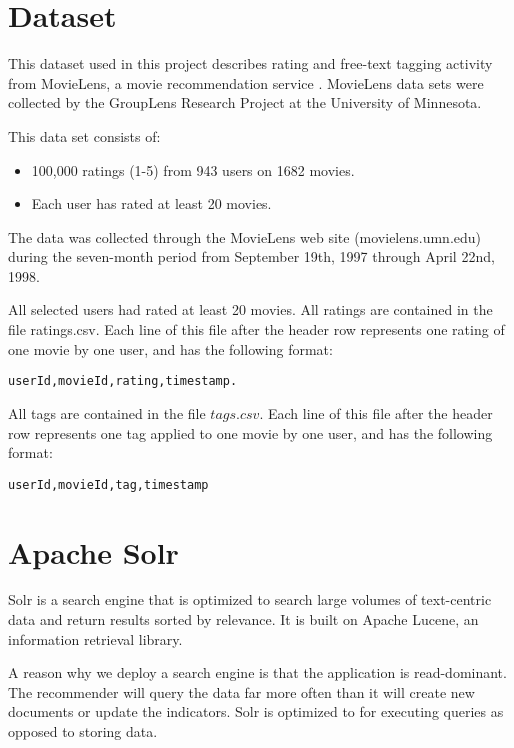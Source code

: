 \documentclass[twoside,a4paper]{article}
\begin{document}
\section{Dataset}
\label{sec:dataset}

This dataset used in this project describes rating and free-text tagging activity from MovieLens, a movie recommendation service \cite{movielensdata}.
MovieLens data sets were collected by the GroupLens Research Project at the University of Minnesota.
 
This data set consists of:
\begin{itemize}
\item 100,000 ratings (1-5) from 943 users on 1682 movies. 
\item Each user has rated at least 20 movies. 
\end{itemize}

The data was collected through the MovieLens web site (movielens.umn.edu) during the seven-month period from September 19th, 
1997 through April 22nd, 1998.

All selected users had rated at least 20 movies.
All ratings are contained in the file ratings.csv. Each line of this file after the header row represents one rating of one movie by one user, and has the following format:

\begin{verbatim}
userId,movieId,rating,timestamp.
\end{verbatim}

All tags are contained in the file $tags.csv$. Each line of this file after the header row represents one tag applied to one movie by one user, and has the following format:
\begin{verbatim}
userId,movieId,tag,timestamp
\end{verbatim}

\section{Apache Solr}
\label{sec:solr}

Solr is a search engine that is optimized to search large volumes of text-centric data and return results sorted by relevance. It is built on Apache Lucene, an information retrieval library.

A reason why we deploy a search engine is that the application is read-dominant. The recommender will query the data far more often than it will create new documents or update the indicators. Solr is optimized to for executing queries as opposed to storing data.
\end{document}
